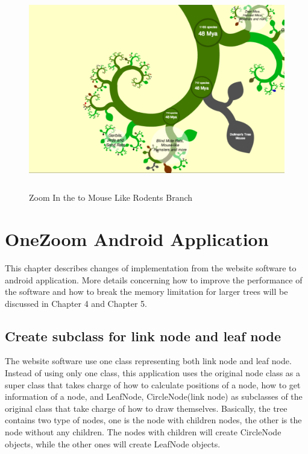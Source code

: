 \documentclass[a4paper,11pt,twoside]{report}
\begin{document}
\begin{figure}[H]
  \centering
  \includegraphics [width=15cm,height=8.8cm]{MouseLikeRodent}
  \caption{Zoom In the to Mouse Like Rodents Branch}
  \label{fig:mouseLikeRodent}
\end{figure}

\chapter{OneZoom Android Application}

This chapter describes changes of implementation from the website software to android application. More details concerning how to improve the performance of the software and how to break the memory limitation for larger trees will be discussed in Chapter 4 and Chapter 5.


\section{Create subclass for link node and leaf node}

The website software use one class representing both link node and leaf node. Instead of using only one class, this application uses the original node class as a super class that takes charge of how to calculate positions of a node, how to get information of a node, and LeafNode, CircleNode(link node) as subclasses of the original class that take charge of how to draw themselves. Basically, the tree contains two type of nodes, one is the node with children nodes, the other is the node without any children. The nodes with children will create CircleNode objects, while the other ones will create LeafNode objects. 
\end{document}
